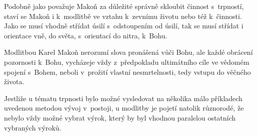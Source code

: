 Podobně jako považuje Makoň za důležité správně skloubit činnost s~trpností,
staví se Makoň i k~modlitbě ve vztahu k~zevnímu životu nebo též k~činnosti. Jako
se musí vhodně střídat úsilí s~odstoupením od úsilí, tak se musí střídat i
orientace vně, do světa, s~orientací do nitra, k~Bohu.

Modlitbou Karel Makoň nerozumí slova pronášená vůči Bohu, ale každé obrácení
pozornosti k~Bohu, vycházeje vždy z~předpokladu ultimátního cíle ve vědomém
spojení s~Bohem, neboli v~prožití vlastní nesmrtelnosti, tedy vstupu do věčného
života.

Jestliže u tématu trpnosti bylo možné vysledovat na několika málo příkladech
uvedenou metodou vývoj v~postoji, u modlitby je pojetí natolik různorodé, že
nebylo vždy možné vybrat výrok, který by byl vhodnou paralelou ostatních
vybraných výroků.

